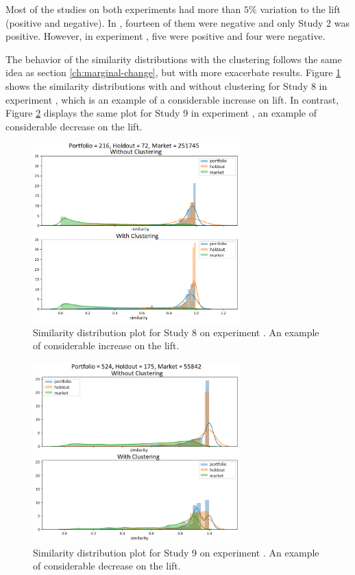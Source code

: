 Most of the studies on both experiments had more than $5\%$ variation to the lift (positive and negative). In \nameExperimentI{}, fourteen of them were negative and only Study 2 was positive. However, in experiment \nameExperimentII{}, five were positive and four were negative.

The behavior of the similarity distributions with the clustering follows the same idea as section \ref{ch:marginal-change}, but with more exacerbate results. Figure \ref{fig:study-8-considerable-increase-exp-2} shows the similarity distributions with and without clustering for Study 8 in experiment \nameExperimentII{}, which is an example of a considerable increase on lift. In contrast, Figure \ref{fig:study-9-considerable-decrease-exp-1} displays the same plot for Study 9 in experiment \nameExperimentI{}, an example of considerable decrease on the lift.

\begin{figure}[!ht]
   \centering
   \includegraphics[width=8cm]{fig/ch4-study-8-considerable-increase-exp-2.png}
   \caption{Similarity distribution plot for Study 8 on experiment \nameExperimentII{}. An example of considerable increase on the lift.}
   \label{fig:study-8-considerable-increase-exp-2}
\end{figure}

\begin{figure}[!ht]
   \centering
   \includegraphics[width=8cm]{fig/ch4-study-9-considerable-decrease-exp-1.png}
   \caption{Similarity distribution plot for Study 9 on experiment \nameExperimentI{}. An example of considerable decrease on the lift.}
   \label{fig:study-9-considerable-decrease-exp-1}
\end{figure}

